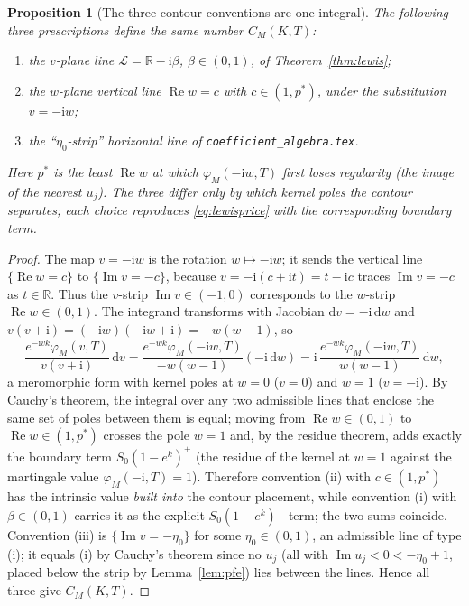 \documentclass[11pt]{article}
\DeclareMathOperator{\Real}{Re}
\DeclareMathOperator{\Imag}{Im}
\newcommand{\R}{\mathbb{R}}
\newcommand{\Ii}{\mathrm{i}}
\newcommand{\dd}{\mathrm{d}}
\theoremstyle{plain}
\newtheorem{proposition}[theorem]{Proposition}
\theoremstyle{definition}
\theoremstyle{remark}
\begin{document}
\begin{proposition}[The three contour conventions are one integral]
\label{prop:contour-equiv}
The following three prescriptions define the same number $C_M(K,T)$:
\begin{enumerate}[label=(\roman*),leftmargin=2.2em]
\item the $v$-plane line $\mathcal L=\R-\Ii\beta$, $\beta\in(0,1)$, of
Theorem~\ref{thm:lewis};
\item the $w$-plane vertical line $\Real w=c$ with $c\in(1,p^\ast)$, under the
substitution $v=-\Ii w$;
\item the ``$\eta_0$-strip'' horizontal line of \texttt{coefficient\_algebra.tex}.
\end{enumerate}
Here $p^\ast$ is the least $\Real w$ at which $\varphi_M(-\Ii w,T)$ first loses
regularity (the image of the nearest $u_j$). The three differ only by which
kernel poles the contour separates; each choice reproduces
\eqref{eq:lewisprice} with the corresponding boundary term.
\end{proposition}
\begin{proof}
The map $v=-\Ii w$ is the rotation $w\mapsto -\Ii w$; it sends the vertical line
$\{\Real w=c\}$ to $\{\Imag v=-c\}$, because $v=-\Ii(c+\Ii t)=t-\Ii c$ traces
$\Imag v=-c$ as $t\in\R$. Thus the $v$-strip $\Imag v\in(-1,0)$ corresponds to the
$w$-strip $\Real w\in(0,1)$. The integrand transforms with Jacobian
$\dd v=-\Ii\,\dd w$ and $v(v+\Ii)=(-\Ii w)(-\Ii w+\Ii)=-w(w-1)$, so
\[
   \frac{e^{-\Ii vk}\varphi_M(v,T)}{v(v+\Ii)}\,\dd v
   =\frac{e^{-w k}\varphi_M(-\Ii w,T)}{-w(w-1)}(-\Ii\,\dd w)
   =\Ii\,\frac{e^{-wk}\varphi_M(-\Ii w,T)}{w(w-1)}\,\dd w,
\]
a meromorphic form with kernel poles at $w=0$ ($v=0$) and $w=1$ ($v=-\Ii$). By
Cauchy's theorem, the integral over any two admissible lines that enclose the same
set of poles between them is equal; moving from $\Real w\in(0,1)$ to
$\Real w\in(1,p^\ast)$ crosses the pole $w=1$ and, by the residue theorem, adds
exactly the boundary term $S_0(1-e^k)^+$ (the residue of the kernel at $w=1$
against the martingale value $\varphi_M(-\Ii,T)=1$). Therefore convention (ii) with
$c\in(1,p^\ast)$ has the intrinsic value \emph{built into} the contour placement,
while convention (i) with $\beta\in(0,1)$ carries it as the explicit
$S_0(1-e^k)^+$ term; the two sums coincide. Convention (iii) is
$\{\Imag v=-\eta_0\}$ for some $\eta_0\in(0,1)$, an admissible line of type (i);
it equals (i) by Cauchy's theorem since no $u_j$ (all with $\Imag u_j<0<-\eta_0+1$,
placed below the strip by Lemma~\ref{lem:pfe}) lies between the lines. Hence all
three give $C_M(K,T)$.
\end{proof}
\end{document}
